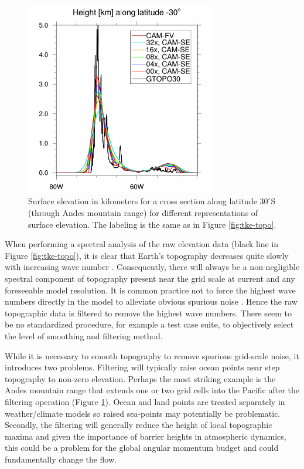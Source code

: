 \documentclass[gmd]{copernicus}
\begin{document}
%
\begin{figure}[t]
\vspace*{2mm}
\begin{center}
\includegraphics[width=8.3cm]{fig/topo-smoothing-height}
\end{center}
  \caption{Surface elevation in kilometers for a cross section along latitude $30^\circ$S (through Andes mountain range) for different representations of surface elevation. The labeling is the same as in Figure \ref{fig:tke-topo}.}\label{fig:topo-smoothing-height}
\end{figure}

When performing a spectral analysis of the raw elevation data (black line in Figure \ref{fig:tke-topo}), it is clear that Earth's topography decreases quite slowly with increasing wave number \citep[see also ][]{B1993GRL,U2001ECMWF,GLS2006NPG}. Consequently, there will always be a non-negligible spectral component of topography present near the grid scale at current and any foreseeable model resolution. It is common practice not to force the highest wave numbers directly in the model to alleviate obvious spurious noise \citep[e.g.][]{NSM1994JC,LH1997MWR}. Hence the raw topographic data is filtered to remove the highest wave numbers. There seem to be no standardized procedure, for example a test case suite, to objectively select the level of smoothing and filtering method. 

While it is necessary to smooth topography to remove spurious grid-scale noise, it introduces two problems. Filtering will typically raise ocean points near step topography to non-zero elevation. Perhaps the most striking example is the Andes mountain range that extends one or two grid cells into the Pacific after the filtering operation (Figure \ref{fig:topo-smoothing-height}). Ocean and land points are treated separately in weather/climate models so raised sea-points may potentially be problematic. Secondly, the filtering will generally reduce the height of local topographic maxima and given the importance of barrier heights in atmospheric dynamics, this could be a problem for the global angular momentum budget and could fundamentally change the flow. 
\end{document}
